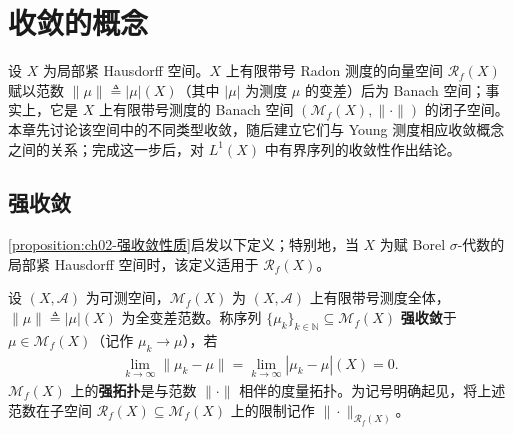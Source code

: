 \documentclass[../../main.tex]{subfiles}%
\begin{document}
\section{收敛的概念}\label{section:ch05-Radon弱星}

设 $X$ 为局部紧 Hausdorff 空间。$X$ 上有限带号 Radon 测度的向量空间 $\mathscr{R}_f(X)$ 赋以范数 $\|\mu\|\triangleq|\mu|(X)$（其中 $|\mu|$ 为测度 $\mu$ 的变差）后为 Banach 空间；事实上，它是 $X$ 上有限带号测度的 Banach 空间 $(\mathcal{M}_f(X),\|\cdot\|)$ 的闭子空间。本章先讨论该空间中的不同类型收敛，随后建立它们与 Young 测度相应收敛概念之间的关系；完成这一步后，对 $L^1(X)$ 中有界序列的收敛性作出结论。

\subsection{强收敛}\label{subsection:ch05-强收敛}

\cref{proposition:ch02-强收敛性质}启发以下定义；特别地，当 $X$ 为赋 Borel $\sigma$-代数的局部紧 Hausdorff 空间时，该定义适用于 $\mathscr{R}_f(X)$。

\begin{definition}\label{definition:ch05-强收敛}
设 $(X,\mathscr{A})$ 为可测空间，$\mathcal{M}_f(X)$ 为 $(X,\mathscr{A})$ 上有限带号测度全体，$\|\mu\|\triangleq|\mu|(X)$ 为全变差范数。称序列 $\{\mu_k\}_{k\in\mathbb{N}}\subseteq\mathcal{M}_f(X)$ \textbf{强收敛}于 $\mu\in\mathcal{M}_f(X)$（记作 $\mu_k\to\mu$），若
\begin{align*}
\lim_{k\to\infty}\|\mu_k-\mu\|=\lim_{k\to\infty}|\mu_k-\mu|(X)=0 .
\end{align*}
$\mathcal{M}_f(X)$ 上的\textbf{强拓扑}是与范数 $\|\cdot\|$ 相伴的度量拓扑。为记号明确起见，将上述范数在子空间 $\mathscr{R}_f(X)\subseteq\mathcal{M}_f(X)$ 上的限制记作 $\|\cdot\|_{\mathscr{R}_f(X)}$。
\end{definition}
\end{document}
